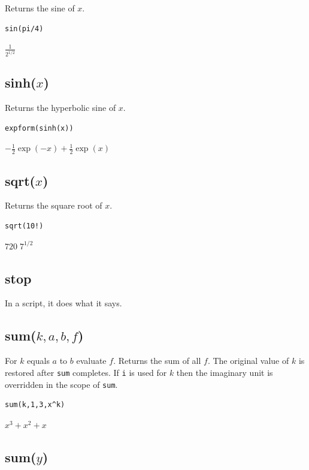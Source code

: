 Returns the sine of $x$.

{\color{blue}
\begin{verbatim}
sin(pi/4)
\end{verbatim}
}

$\displaystyle \frac{1}{2^{1/2}}$

\subsection*{sinh($x$)}

Returns the hyperbolic sine of $x$.

{\color{blue}
\begin{verbatim}
expform(sinh(x))
\end{verbatim}
}

$\displaystyle -\tfrac{1}{2}\exp(-x)+\tfrac{1}{2}\exp(x)$

\subsection*{sqrt($x$)}

Returns the square root of $x$.

{\color{blue}
\begin{verbatim}
sqrt(10!)
\end{verbatim}
}

$\displaystyle 720\; 7^{1/2}$

\subsection*{stop}

In a script, it does what it says.

\subsection*{sum($k,a,b,f$)}

For $k$ equals $a$ to $b$ evaluate $f$.
Returns the sum of all $f$.
The original value of $k$ is restored after \verb$sum$ completes.
If \verb$i$ is used for $k$ then the imaginary unit is overridden in the scope of \verb$sum$.

{\color{blue}
\begin{verbatim}
sum(k,1,3,x^k)
\end{verbatim}
}

$x^3+x^2+x$

\subsection*{sum($y$)}

